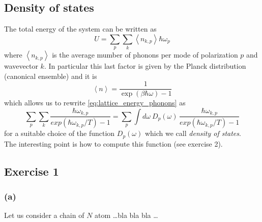 \subsection*{Density of states}
The total energy of the system can be written as
\begin{equation}
    U = \sum_{p}\sum_{k} \left\langle n_{k,p} \right\rangle \hbar \omega_p
    \label{eq:lattice_energy_phonons}
\end{equation}
where $\left\langle n_{k,p} \right\rangle$ is the average mumber of phonons per mode of polarization $p$ and wavevector $k$. In particular this last factor
is given by the Planck distribution (canonical ensemble) and it is 
$$\left\langle n \right\rangle = \frac{1}{\exp(\beta\hbar\omega) - 1}$$
which allows us to rewrite \ref{eq:lattice_energy_phonons} as 
\begin{equation*}
    \sum_p \sum_k \frac{\hbar \omega_{k,p}}{exp(\hbar\omega_{k,p}/T) - 1} = \sum_p \int d\omega \ D_p(\omega) \, \frac{\hbar \omega_{k,p}}{exp(\hbar\omega_{k,p}/T) - 1}
\end{equation*}
for a suitable choice of the function $D_p(\omega)$ which we call \emph{density of states}. \\
The interesting point is how to compute this function (see exercise 2).
\subsection*{Exercise 1}
\subsubsection*{(a)}
Let us consider a chain of $N$ atom \dots bla bla bla \dots
